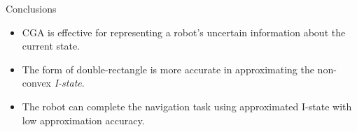 \documentclass[10pt]{beamer}
\begin{document}
\begin{frame}{Conclusions}
  \begin{itemize}
  \item CGA is effective for representing a robot's uncertain information about
    the current state.
  \item The form of double-rectangle is more accurate in approximating the non-convex
    \emph{I-state}.
  \item The robot can complete the navigation task using approximated I-state with
    low approximation accuracy.
  \end{itemize}
\end{frame}
\end{document}
